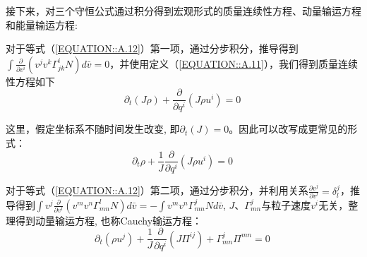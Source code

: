 \documentclass[LBMDerivation.tex]{subfiles}
\begin{document}
%
%




接下来，对三个守恒公式通过积分得到宏观形式的质量连续性方程、动量输运方程和能量输运方程:


对于等式（\ref{EQUATION::A.12}）第一项，通过分步积分，推导得到$\int\frac{\partial}{\partial v^{i}}\left( v^{j} v^{k} \Gamma_{j k}^{i} N\right)d \bar{v}=0$，并使用定义（\ref{EQUATION::A.11}），我们得到质量连续性方程如下
%
%
\begin{equation}
  \partial_{t}(J \rho)+\frac{\partial}{\partial q^{i}}\left(J \rho u^{i}\right)=0
  \label{EQUATION::A.13} ~
\end{equation}
%
%

这里，假定坐标系不随时间发生改变, 即$\partial_{t}(J)=0$。因此可以改写成更常见的形式：
%
%
\begin{equation}
  \boxed{
    \partial_{t} \rho+\frac{1}{J} \frac{\partial}{\partial q^{i}}\left(J \rho u^{i}\right)=0
  }
  \label{EQUATION::A.14} ~
\end{equation}
%
%

%
%

对于等式（\ref{EQUATION::A.12}）第二项，通过分步积分，并利用关系$\frac{\partial v^{j}}{\partial v^{l}}=\delta_{l}^{j}$，推导得到$\int v^{j}\frac{\partial}{\partial v^{l}}\left(v^{m} v^{n} \Gamma_{mn}^{l} N\right)d\bar{v}=-\int v^{m} v^{n} \Gamma_{mn}^{j} N d\bar{v}$, $J$、$\Gamma_{mn}^j$与粒子速度$v^i$无关，整理得到动量输运方程, 也称Cauchy输运方程：
%
%
\begin{equation}
  \boxed{
    \partial_{t}\left(\rho u^{j}\right)+\frac{1}{J} \frac{\partial}{\partial q^{i}}\left(J \Pi^{i j}\right)+\Gamma_{m n}^{j} \Pi^{m n}=0
  }
  \label{动量输运方程} ~
\end{equation}
%
%
\end{document}
